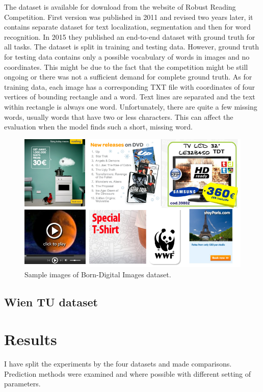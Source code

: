 The dataset is available for download from the website of Robust Reading Competition. First version was published in 2011 and revised two years later, it contains separate dataset for text localization, segmentation and then for word recognition. In 2015 they published an end-to-end dataset with ground truth for all tasks. The dataset is split in training and testing data. However, ground truth for testing data contains only a possible vocabulary of words in images and no coordinates. This might be due to the fact that the competition might be still ongoing or there was not a sufficient demand for complete ground truth. As for training data, each image has a corresponding TXT file with coordinates of four vertices of bounding rectangle and a word. Text lines are separated and the text within rectangle is always one word. Unfortunately, there are quite a few missing words, usually words that have two or less characters. This can affect the evaluation when the model finds such a short, missing word.\cite{born-digital1}

\begin{figure}[hbtp]
    \centering
    \includegraphics[scale=0.4]{obrazky/Dataset_born-digital.png}
    \caption{Sample images of Born-Digital Images dataset.}
    \label{Obr:Dbd}
\end{figure}


\subsection{Wien TU dataset}

\section{Results}

I have split the experiments by the four datasets and made comparisons. Prediction methods were examined and where possible with different setting of parameters.

